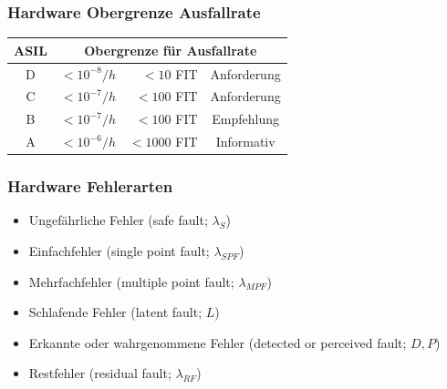 \documentclass[]{beamer}
\begin{document}
\begin{frame}
\frametitle{Hardware Obergrenze Ausfallrate}

\begin{center}
\begin{tabular}[h]{c r r c}
\toprule
ASIL & \multicolumn{3}{c}{Obergrenze für Ausfallrate}\\
\midrule
D & $ <10^{-8}/h $ & $ <10 $ FIT & Anforderung\\
C & $ <10^{-7}/h $ & $ <100 $ FIT   & Anforderung\\
B & $ <10^{-7}/h $ & $ <100 $ FIT   & Empfehlung\\
A & $ <10^{-6}/h $ & $ <1000 $ FIT   & Informativ\\
\bottomrule
\end{tabular}
\end{center}

\end{frame}

\begin{frame}
\frametitle{Hardware Fehlerarten}

\begin{itemize}
    \item Ungefährliche Fehler (safe fault; $ \lambda_S $)
    \item Einfachfehler (single point fault; $ \lambda_{SPF} $)
    \item Mehrfachfehler (multiple point fault; $ \lambda_{MPF} $)
    \item Schlafende Fehler (latent fault; $ L $)
    \item Erkannte oder wahrgenommene Fehler (detected or perceived fault; $ D, P $)
    \item Restfehler (residual fault; $ \lambda_{RF} $)
\end{itemize}

\end{frame}
\end{document}
